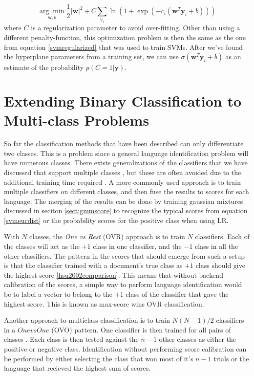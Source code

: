\begin{equation}
\label{logisticreg}
\underset{\mathbf{w}, b}{\arg \min} \frac{1}{2}|\mathbf{w}|^2+C\sum_{\forall_i} \ln(1+\exp(-c_i(\mathbf{w}^T\mathbf{y}_i+b)))
\end{equation}
where $C$ is a regularization parameter to avoid over-fitting. Other than using a different penalty-function, this optimization problem is then the same as the one from equation \ref{svmregularized} that was used to train SVMs. After we've found the hyperplane parameters from a training set, we can use $\sigma(\mathbf{w}^T\mathbf{y}_i+b)$ as an estimate of the probability $p(C=1|\mathbf{y})$.

\section{Extending Binary Classification to Multi-class Problems}
\label{sect:multiclass}

So far the classification methods that have been described can only differentiate two classes. This is a problem since a general language identification problem will have numerous classes. There exists generalizations of the classifiers that we have discussed that support multiple classes \cite[p. 209]{machinelearningbook,hsu2002comparison}, but these are often avoided due to the additional training time required \cite{hsu2002comparison}. A more commonly used approach is to train multiple classifiers on different classes, and then fuse the results to scores for each language. The merging of the results can be done by training gaussian mixtures discussed in seciton \ref{sect:gmmscore} to recognize the typical scores from equation \ref{svmeucdist} or the probability scores for the positive class when using LR.

With $N$ classes, the \emph{One vs Rest} (OVR) approach is to train $N$ classifiers. Each of the classes will act as the $+1$ class in one classifier, and the $-1$ class in all the other classifiers. The pattern in the scores that should emerge from such a setup is that the classifier trained with a document's true class as $+1$ class should give the highest score \ref{hsu2002comparison}. This means that without backend calibration of the scores, a simple way to perform language identification would be to label a vector to belong to the $+1$ class of the classifier that gave the highest score. This is known as max-score wins OVR classification.

Another approach to multiclass classification is to train $N(N-1)/2$ classifiers in a $One vs One$ (OVO) pattern. One classifier is then trained for all pairs of classes \cite{hsu2002comparison}. Each class is then tested against the $n-1$ other classes as either the positive or negative class. Identification without performing score calibration can be performed by either selecting the class that won most of it's $n-1$ trials \cite{hsu2002comparison} or the language that recieved the highest sum of scores.

